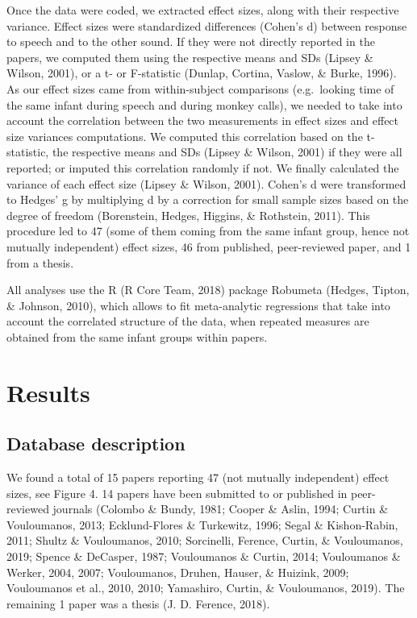 \documentclass[man,floatsintext]{apa6}
\begin{document}
Once the data were coded, we extracted effect sizes, along with their
respective variance. Effect sizes were standardized differences (Cohen's
d) between response to speech and to the other sound. If they were not
directly reported in the papers, we computed them using the respective
means and SDs (Lipsey \& Wilson, 2001), or a t- or F-statistic (Dunlap,
Cortina, Vaslow, \& Burke, 1996). As our effect sizes came from
within-subject comparisons (e.g.~looking time of the same infant during
speech and during monkey calls), we needed to take into account the
correlation between the two measurements in effect sizes and effect size
variances computations. We computed this correlation based on the
t-statistic, the respective means and SDs (Lipsey \& Wilson, 2001) if
they were all reported; or imputed this correlation randomly if not. We
finally calculated the variance of each effect size (Lipsey \& Wilson,
2001). Cohen's d were transformed to Hedges' g by multiplying d by a
correction for small sample sizes based on the degree of freedom
(Borenstein, Hedges, Higgins, \& Rothstein, 2011). This procedure led to
47 (some of them coming from the same infant group, hence not mutually
independent) effect sizes, 46 from published, peer-reviewed paper, and 1
from a thesis.

All analyses use the R (R Core Team, 2018) package Robumeta (Hedges,
Tipton, \& Johnson, 2010), which allows to fit meta-analytic regressions
that take into account the correlated structure of the data, when
repeated measures are obtained from the same infant groups within
papers.

\section{Results}\label{results}

\subsection{Database description}\label{database-description}

We found a total of 15 papers reporting 47 (not mutually independent)
effect sizes, see Figure 4. 14 papers have been submitted to or
published in peer-reviewed journals (Colombo \& Bundy, 1981; Cooper \&
Aslin, 1994; Curtin \& Vouloumanos, 2013; Ecklund-Flores \& Turkewitz,
1996; Segal \& Kishon-Rabin, 2011; Shultz \& Vouloumanos, 2010;
Sorcinelli, Ference, Curtin, \& Vouloumanos, 2019; Spence \& DeCasper,
1987; Vouloumanos \& Curtin, 2014; Vouloumanos \& Werker, 2004, 2007;
Vouloumanos, Druhen, Hauser, \& Huizink, 2009; Vouloumanos et al., 2010,
2010; Yamashiro, Curtin, \& Vouloumanos, 2019). The remaining 1 paper
was a thesis (J. D. Ference, 2018).
\end{document}
